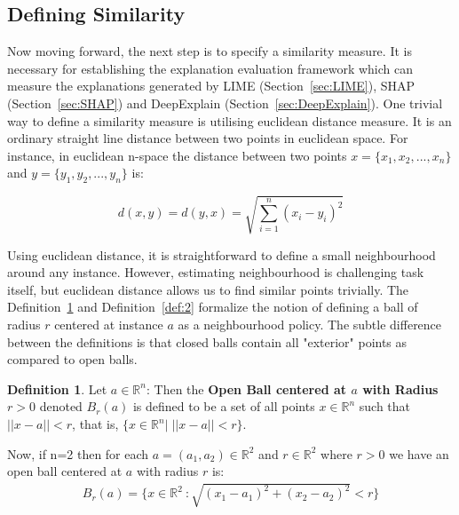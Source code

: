 \documentclass[english]{tktltiki2}
\theoremstyle{definition}
\newtheorem{definition}[thm]{Definition}
\theoremstyle{remark}
\begin{document}
%
%
%




\subsection{Defining Similarity}\label{sec:defining_similarity} %
Now moving forward, the next step is to specify a similarity measure. It is necessary for establishing the explanation evaluation framework which can measure the explanations generated by LIME (Section~\ref{sec:LIME}), SHAP (Section~\ref{sec:SHAP}) and DeepExplain (Section~\ref{sec:DeepExplain}). One trivial way to define a similarity measure is utilising euclidean distance measure. It is an ordinary straight line distance between two points in euclidean space. For instance, in euclidean n-space the distance between two points $x = \{x_1, x_2, ..., x_n\}$ and $y = \{y_1, y_2, ..., y_n\}$ is:

\begin{equation}\label{eq:euclidean_distance}
d(x,y) = d(y,x) = \sqrt{\sum_{i=1}^{n}(x_i - y_i)^2}
\end{equation}

Using euclidean distance, it is straightforward to define a small neighbourhood around any instance. However, estimating neighbourhood is challenging task itself, but euclidean distance allows us to find similar points trivially. The Definition~\ref{def:1} and Definition~\ref{def:2} formalize the notion of defining a ball of radius $r$ centered at instance $a$ as a neighbourhood policy. The subtle difference between the definitions is that closed balls contain all "exterior" points as compared to open balls.

\begin{definition}\label{def:1}{Let $a \in {\mathbb{R}}^n$: Then the \textbf{Open Ball centered at $a$ with Radius $r > 0$} denoted $B_{r}(a)$ is defined to be a set of all points $x \in {\mathbb{R}}^n$ such that $||x-a|| < r$, that is, $\{x \in {\mathbb{R}}^n |\;||x - a|| < r\}.$}
\end{definition}
Now, if n=2 then for each $a = (a_1,a_2) \in {\mathbb{R}}^2$ and $r \in {\mathbb{R}}^2$ where $r > 0$ we have an open ball centered at $a$ with radius $r$ is:
\begin{align*}
B_{r}(a) = \{x \in {\mathbb{R}}^2\ : \sqrt{(x_1 - a_1)^2 + (x_2 - a_2)^2} < r\}
\end{align*}
\end{document}
